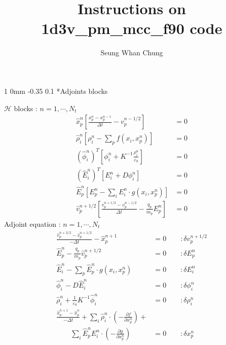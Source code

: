 \documentclass[11pt]{article}
\title{Instructions on 1d3v\_pm\_mcc\_f90 code}
\author{Seung Whan Chung}
\makeatletter
\renewcommand{\subsection}{\@startsection
{subsection}%
{1}%
{0mm}%
{-0.35\baselineskip}%
{0.1\baselineskip}%
{\normalfont\large\bfseries\color{brown}}}%
\def\Dpartial#1#2{ \frac{\partial #1}{\partial #2} }
\newcommand{\vp}{v_p}
\newcommand{\xp}{x_p}
\newcommand{\Dt}{\Delta t}
\newcommand{\vph}{\hat{v}_p}
\newcommand{\xph}{\hat{x}_p}
\newcommand{\Eh}{\hat{E}}
\newcommand{\phih}{\hat{\phi}}
\newcommand{\rhoh}{\hat{\rho}}
\newcommand{\cH}{\mathcal{H}}
\makeatother
\begin{document}
\maketitle
\tableofcontents
\clearpage

\subsection*{Adjoints blocks}

\begin{multicols}{2}
$\cH$ blocks : $n=1,\cdots,N_t$
\begin{equation*}
\begin{split}
\xph^{n}\left[ \frac{\xp^{n} - \xp^{n-1}}{\Dt} - \vp^{n-1/2} \right] &= 0\\
\rhoh_{i}^n\left[ \rho_{i}^n - \sum\limits_p f\left( x_{i}, x_p^n \right) \right] &= 0\\
\left( \phih_i^{n} \right)^T\left[ \phi_i^n + K^{-1}\frac{\rho_i^n}{\varepsilon_0} \right] &= 0\\
\left( \Eh_i^n \right)^T\left[ E_i^n + D\phi_i^n \right] &= 0\\
\Eh_{p}^{n}\left[ E_{p}^{n} - \sum\limits_{i}E_{i}^{n}\cdot g\left( x_{i}, x_p^{n} \right) \right] &= 0\\
\vph^{n+1/2}\left[ \frac{\vp^{n+1/2} - \vp^{n-1/2}}{\Dt} - \frac{q_p}{m_p}E_p^{n} \right] &= 0
\end{split}
\end{equation*}
Adjoint equation : $n=1,\cdots,N_t$
\begin{equation*}
\begin{split}
\frac{\vph^{n+3/2} - \vph^{n+1/2}}{-\Dt} - \xph^{n+1} &= 0\qquad:\delta \vp^{n+1/2}\\
\Eh_{p}^{n} - \frac{q_p}{m_p}\vph^{n+1/2} &= 0\qquad:\delta E_p^{n}\\
\Eh_{i}^{n} - \sum\limits_p \Eh_{p}^{n}\cdot g\left( x_{i}, x_p^{n} \right) &= 0\qquad:\delta E_i^{n}\\
\phih_i^{n} - D\Eh_i^{n} &= 0\qquad:\delta \phi_i^{n}\\
\rhoh_i^{n} + \frac{1}{\varepsilon_0}K^{-1}\phih_i^{n} &= 0\qquad:\delta \rho_i^{n}\\
\frac{\xph^{n+1} - \xph^{n}}{-\Dt} + \sum\limits_{i}\rhoh_{i}^{n}\cdot\left( -\Dpartial{f}{x_p^{n}} \right) + &\\
\qquad\sum\limits_{i} \Eh_{p}^{n}E_{i}^{n}\cdot\left( -\Dpartial{g}{x_p^{n}} \right) &= 0\qquad:\delta \xp^{n}
\end{split}
\end{equation*}
\end{multicols}
\end{document}

